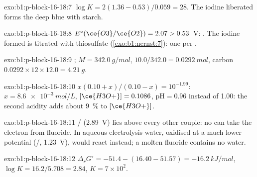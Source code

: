 \begin{solution}{exo:b1:p-block-16-18:7}
$\log K = 2(1.36 - 0.53)/0.059 = 28$. The iodine liberated forms the deep
blue  with starch.
\end{solution}

\begin{solution}{exo:b1:p-block-16-18:8}
$E^\circ(\ce{O3}/\ce{O2}) = 2.07 > 0.53$~V: . The iodine formed is titrated with thiosulfate
(\cref{exo:b1:nernst:7}): one  per .
\end{solution}

\begin{solution}{exo:b1:p-block-16-18:9}
; $M = \qty{342.0}{g/mol}$, $10.0/342.0 =
\qty{0.0292}{mol}$, carbon $0.0292 \times 12 \times 12.0 = \qty{4.21}{g}$.
\end{solution}

\begin{solution}{exo:b1:p-block-16-18:10}
$x(0.10 + x)/(0.10 - x) = 10^{-1.99}$: $x = \qty{8.6e-3}{mol/L}$,
$[\ce{H3O+}] = 0.1086$, $\mathrm{pH} = 0.96$ instead of 1.00: the second
acidity adds about \qty{9}{\percent} to $[\ce{H3O+}]$.
\end{solution}

\begin{solution}{exo:b1:p-block-16-18:11}
/ (2.89~V) lies above every other couple: no  can take
the electron from fluoride. In aqueous electrolysis water, oxidised at a
much lower potential (/, 1.23~V), would react instead; a
molten fluoride contains no water.
\end{solution}

\begin{solution}{exo:b1:p-block-16-18:12}
$\Delta_r G^\circ = -51.4 - (16.40 - 51.57) = \qty{-16.2}{kJ/mol}$,
$\log K = 16.2/5.708 = 2.84$, $K = 7 \times 10^2$.
\end{solution}

